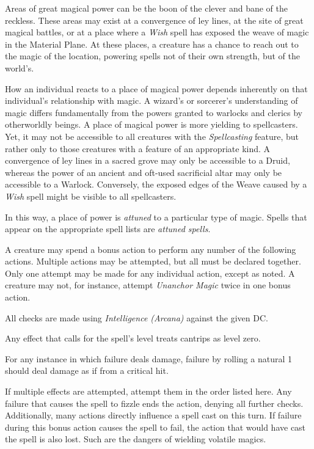 Areas of great magical power can be the boon of the clever and bane of
the reckless.  These areas may exist at a convergence of ley lines, at
the site of great magical battles, or at a place where a {\it Wish}
spell has exposed the weave of magic in the Material Plane.  At these
places, a creature has a chance to reach out to the magic of the
location, powering spells not of their own strength, but of the
world's.

How an individual reacts to a place of magical power depends
inherently on that individual's relationship with magic.  A wizard's
or sorcerer's understanding of magic differs fundamentally from the
powers granted to warlocks and clerics by otherworldly beings.  A
place of magical power is more yielding to spellcasters.  Yet, it may
not be accessible to all creatures with the {\it Spellcasting}
feature, but rather only to those creatures with a feature of an
appropriate kind.  A convergence of ley lines in a sacred grove may
only be accessible to a Druid, whereas the power of an ancient and
oft-used sacrificial altar may only be accessible to a Warlock.
Conversely, the exposed edges of the Weave caused by a {\it Wish}
spell might be visible to all spellcasters.

In this way, a place of power is {\it attuned} to a particular type of
magic.  Spells that appear on the appropriate spell lists are {\it
  attuned spells}.

A creature may spend a bonus action to perform any number of the
following actions.  Multiple actions may be attempted, but all must be
declared together.  Only one attempt may be made for any individual
action, except as noted.  A creature may not, for instance, attempt
{\it Unanchor Magic} twice in one bonus action.

All checks are made using {\it Intelligence (Arcana)} against the
given DC.

Any effect that calls for the spell's level treats cantrips as level
zero.

For any instance in which failure deals damage, failure by rolling a
natural 1 should deal damage as if from a critical hit.

  
  
  If multiple effects are attempted, attempt them in the order listed
  here.  Any failure that causes the spell to fizzle ends the action,
  denying all further checks.  Additionally, many actions directly
  influence a spell cast on this turn.  If failure during this bonus
  action causes the spell to fail, the action that would have cast the
  spell is also lost.  Such are the dangers of wielding volatile
  magics.
  


